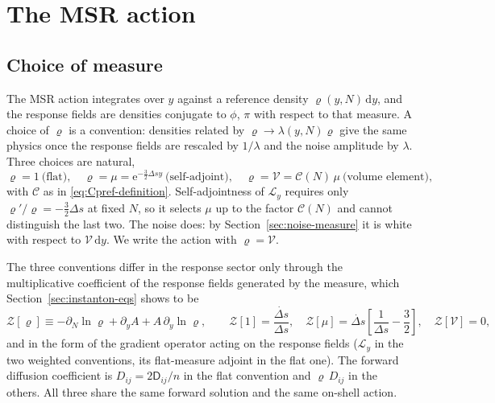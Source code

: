 \documentclass[a4paper,11pt]{article}
\renewcommand{\d}{\mathrm{d}}
\newcommand{\e}[1]{\mathrm{e}^{{#1}}}
\newcommand{\Ny}{N}                          %
\newcommand{\field}{\phi}                    %
\newcommand{\mom}{\pi}                       %
\newcommand{\yco}{y}                         %
\newcommand{\Deltas}{\Delta s}                %
\newcommand{\measure}{\mu}                   %
\newcommand{\advcoef}{A}                     %
\newcommand{\Lop}{\mathcal{L}_\yco}          %
\newcommand{\Dnoise}[1]{D_{#1}}              %
\newcommand{\Dcm}[1]{\mathsf{D}_{#1}}        %
\newcommand{\ncount}{n}                      %
\newcommand{\volel}{\mathcal{V}}             %
\newcommand{\Cpref}{\mathcal{C}}             %
\begin{document}
\section{The MSR action}
\label{sec:msr-action}

\subsection{Choice of measure}
\label{sec:measure-choice}

The MSR action integrates over $\yco$ against a reference density
$\varrho(\yco,\Ny)\,\d\yco$, and the response fields are densities
conjugate to $\field$, $\mom$ with respect to that measure. A choice of
$\varrho$ is a convention: densities related by
$\varrho\to\lambda(\yco,\Ny)\varrho$ give the same physics once the
response fields are rescaled by $1/\lambda$ and the noise amplitude by
$\lambda$. Three choices are natural,
\begin{equation}
    \varrho = 1 \ \text{(flat)} , \quad
    \varrho = \measure = \e{-\frac32\Deltas\yco} \ \text{(self-adjoint)} , \quad
    \varrho = \volel = \Cpref(\Ny)\,\measure \ \text{(volume element)} ,
\end{equation}
with $\Cpref$ as in \eqref{eq:Cpref-definition}. Self-adjointness of
$\Lop$ requires only $\varrho'/\varrho = -\tfrac32\Deltas$ at fixed $\Ny$,
so it selects $\measure$ up to the factor $\Cpref(\Ny)$ and cannot
distinguish the last two. The noise does: by Section~\ref{sec:noise-measure}
it is white with respect to $\volel\,\d\yco$. We write the action with
$\varrho=\volel$.

The three conventions differ in the response sector only through the
multiplicative coefficient of the response fields generated by the
measure, which Section~\ref{sec:instanton-eqs} shows to be
\begin{equation}
    \mathcal{Z}[\varrho] \equiv -\partial_\Ny\ln\varrho + \partial_\yco\advcoef + \advcoef\,\partial_\yco\ln\varrho ,
    \qquad
    \mathcal{Z}[1] = \frac{\dot{\Deltas}}{\Deltas} , \quad
    \mathcal{Z}[\measure] = \dot{\Deltas}\left[\frac{1}{\Deltas}-\frac32\right] , \quad
    \mathcal{Z}[\volel] = 0 ,
    \label{eq:Z-conventions}
\end{equation}
and in the form of the gradient operator acting on the response fields
($\Lop$ in the two weighted conventions, its flat-measure adjoint in the
flat one). The forward diffusion coefficient is $\Dnoise{ij}=2\Dcm{ij}/\ncount$
in the flat convention and $\varrho\,\Dnoise{ij}$ in the others. All three
share the same forward solution and the same on-shell action.
\end{document}
